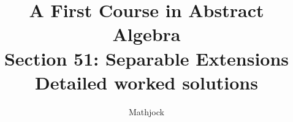 
\title{\textbf{A First Course in Abstract Algebra}\\[0.3em]Section 51: Separable Extensions\\[0.3em]\large Detailed worked solutions}
\author{Mathjock}
\date{}

\maketitle
\bookinfo
\tableofcontents
\clearpage
\renewcommand{\thesection}{51}
\renewcommand{\theHsection}{fraleigh.51}


